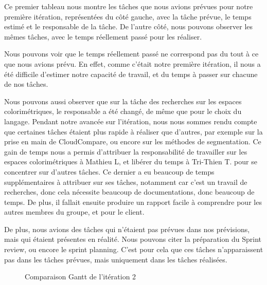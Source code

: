 \documentclass[12pt,titlepage,french]{article}
\begin{document}
Ce premier tableau nous montre les tâches que nous avions prévues pour notre première itération, représentées du côté gauche, avec la tâche prévue, le temps estimé et le responsable de la tâche. De l'autre côté, nous pouvons observer les mêmes tâches, avec le temps réellement passé pour les réaliser. \newline

Nous pouvons voir que le temps réellement passé ne correspond pas du tout à ce que nous avions prévu. En effet, comme c'était notre première itération, il nous a été difficile d'estimer notre capacité de travail, et du temps à passer sur chacune de nos tâches. \newline

Nous pouvons aussi observer que sur la tâche des recherches sur les espaces colorimétriques, le responsable a été changé, de même que pour le choix du langage. Pendant notre avancée sur l'itération, nous nous sommes rendu compte que certaines tâches étaient plus rapide à réaliser que d'autres, par exemple sur la prise en main de CloudCompare, ou encore sur les méthodes de segmentation. Ce gain de temps nous a permis d'attribuer la responsabilité de travailler sur les espaces colorimétriques à Mathieu L, et libérer du temps à Tri-Thien T. pour se concentrer sur d'autres tâches. Ce dernier a eu beaucoup de temps supplémentaires à attribuer sur ses tâches, notamment car c'est un travail de recherches, donc cela nécessite beaucoup de documentations, donc beaucoup de temps. De plus, il fallait ensuite produire un rapport facile à comprendre pour les autres membres du groupe, et pour le client. \newline

De plus, nous avions des tâches qui n'étaient pas prévues dans nos prévisions, mais qui étaient présentes en réalité. Nous pouvons citer la préparation du Sprint review, ou encore le sprint planning. C'est pour cela que ces tâches n'apparaissent pas dans les tâches prévues, mais uniquement dans les tâches réalisées.

\begin{figure}[!hbtp]
    \caption{\label{} Comparaison Gantt de l'itération 2}
\end{figure}
\end{document}
